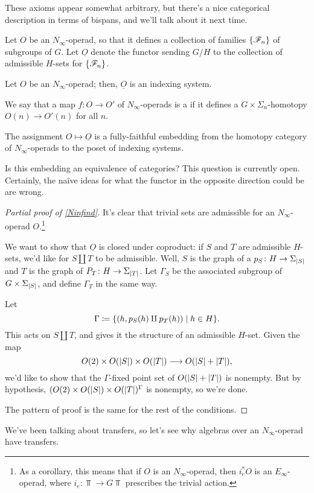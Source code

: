 These axioms appear somewhat arbitrary, but there's a nice categorical description in terms of bispans, and we'll
talk about it next time.
\begin{defn}
Let $O$ be an $N_\infty$-operad, so that it defines a collection of families $\{\mathscr F_n\}$ of subgroups of $G$.
Let $\underline O$ denote the functor sending $G/H$ to the collection of admissible $H$-sets for $\{\mathscr F_n\}$.
\end{defn}
\begin{prop}
\label{Ninfind}
Let $O$ be an $N_\infty$-operad; then, $\underline O$ is an indexing system.
\end{prop}
We say that a map $f\colon O\to O'$ of $N_\infty$-operads is a  if it defines a
$G\times\Sigma_n$-homotopy $O(n)\to O'(n)$ for all $n$.
\begin{thm}
The assignment $O\mapsto\underline O$ is a fully-faithful embedding from the homotopy category of
$N_\infty$-operads to the poset of indexing systems.
\end{thm}
\begin{ques}
Is this embedding an equivalence of categories? This question is currently open. Certainly, the naïve ideas for
what the functor in the opposite direction could be are wrong.
\end{ques}
\begin{proof}[Partial proof of \cref{Ninfind}]
It's clear that trivial sets are admissible for an $N_\infty$-operad $O$.\footnote{As a corollary, this means that
if $O$ is an $N_\infty$-operad, then $i_e^*O$ is an $E_\infty$-operad, where $i_e\colon\Top\to G\Top$ prescribes
the trivial action.}

We want to show that $\underline O$ is closed under coproduct: if $S$ and $T$ are admissible $H$-sets, we'd like
for $S\amalg T$ to be admissible. Well, $S$ is the graph of a $p_S\colon H\to\Sigma_{\lvert S\rvert}$ and $T$ is the graph
of $P_T\colon H\to\Sigma_{\lvert T\rvert}$. Let $\Gamma_S$ be the associated subgroup of $G\times\Sigma_{\lvert S\rvert}$, and
define $\Gamma_T$ in the same way.

Let
\[\Gamma\coloneqq \{(h, p_S(h)\amalg p_T(h))\mid h\in H\}.\]
This acts on $S\amalg T$, and gives it the structure of an admissible $H$-set. Given the map
\[O(2)\times O(\lvert S\rvert)\times O(\lvert T\rvert)\longrightarrow O(\lvert S\rvert + \lvert T\rvert),\]
we'd like to show that the $\Gamma$-fixed point set of $O(\lvert S\rvert + \lvert T\rvert)$ is nonempty. But by hypothesis,
$(O(2)\times O(\lvert S\rvert)\times O(\lvert T\rvert)^\Gamma$ is nonempty, so we're done.

The pattern of proof is the same for the rest of the conditions.
\end{proof}
We've been talking about transfers, so let's see why algebras over an $N_\infty$-operad have transfers.

